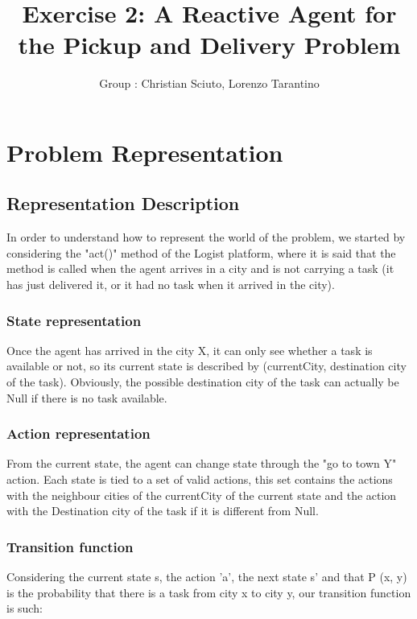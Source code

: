 \documentclass[11pt]{article}
\title{\bf Exercise 2: A Reactive Agent for the Pickup and Delivery Problem}
\author{Group \textnumero 15: Christian Sciuto, Lorenzo Tarantino}
\begin{document}
\maketitle

\section{Problem Representation}

\subsection{Representation Description}
In order to understand how to represent the world of the problem, we started by considering the "act()" method of the Logist platform, where it is said that the method is called when the agent arrives in a city and is not carrying a task (it has just delivered it, or it had no task when it arrived in the city).

\subsubsection{State representation}
Once the agent has arrived in the city X, it can only see whether a task is available or not, so its current state is described by (currentCity, destination city of the task). Obviously, the possible destination city of the task can actually be Null if there is no task available.

\subsubsection{Action representation}
From the current state, the agent can change state through the "go to town Y" action. Each state is tied to a set of valid actions, this set contains the actions with the neighbour cities of the currentCity of the current state and the action with the Destination city of the task if it is different from Null.

\subsubsection{Transition function}
Considering the current state s, the action 'a', the next state s' and that P (x, y) is the probability that there is a task from city x to city y, our transition function is such:
\end{document}
